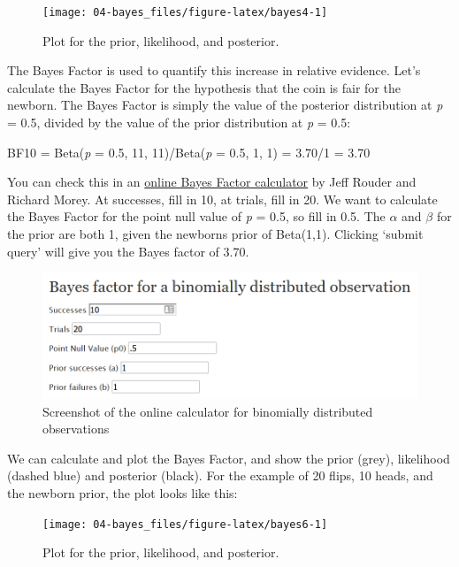 \documentclass[
]{krantz}
\begin{document}
\begin{figure}

{\centering \texttt{[image: 04-bayes\_files/figure-latex/bayes4-1]} 

}

\caption{Plot for the prior, likelihood, and posterior.}\label{fig:bayes4}
\end{figure}

The Bayes Factor is used to quantify this increase in relative evidence. Let's calculate the Bayes Factor for the hypothesis that the coin is fair for the newborn. The Bayes Factor is simply the value of the posterior distribution at \emph{p} = 0.5, divided by the value of the prior distribution at \emph{p} = 0.5:

BF10 = Beta(\emph{p} = 0.5, 11, 11)/Beta(\emph{p} = 0.5, 1, 1) = 3.70/1 = 3.70

You can check this in an \href{http://pcl.missouri.edu/bf-binomial}{online Bayes Factor calculator} by Jeff Rouder and Richard Morey. At successes, fill in 10, at trials, fill in 20. We want to calculate the Bayes Factor for the point null value of \emph{p} = 0.5, so fill in 0.5. The \(\alpha\) and \(\beta\) for the prior are both 1, given the newborns prior of Beta(1,1). Clicking `submit query' will give you the Bayes factor of 3.70.

\begin{figure}

{\centering \includegraphics[width=1\linewidth]{images/binombayesonline} 

}

\caption{Screenshot of the online calculator for binomially distributed observations}\label{fig:gpower-screenshot}
\end{figure}

We can calculate and plot the Bayes Factor, and show the prior (grey), likelihood (dashed blue) and posterior (black). For the example of 20 flips, 10 heads, and the newborn prior, the plot looks like this:

\begin{figure}

{\centering \texttt{[image: 04-bayes\_files/figure-latex/bayes6-1]} 

}

\caption{Plot for the prior, likelihood, and posterior.}\label{fig:bayes6}
\end{figure}
\end{document}
